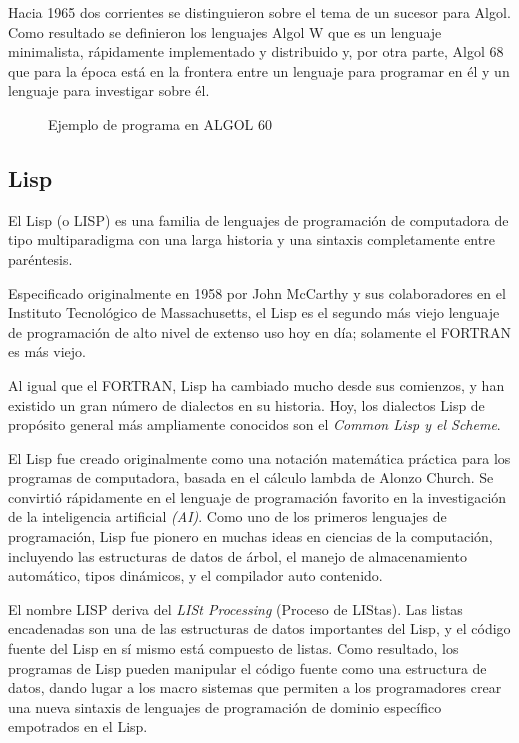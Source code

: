 \documentclass[twoside,twocolumn]{article}
\begin{document}
Hacia 1965 dos corrientes se distinguieron sobre el tema de un sucesor para Algol. Como resultado se definieron los lenguajes Algol W que es un lenguaje minimalista, rápidamente implementado y distribuido y, por otra parte, Algol 68 que para la época está en la frontera entre un lenguaje para programar en él y un lenguaje para investigar sobre él.


\begin{figure}[h]
\label{Fig1}
\caption[al.png]{Ejemplo de programa en ALGOL 60 }
\end{figure}

\subsection{Lisp}

El Lisp (o LISP) es una familia de lenguajes de programación de computadora de tipo multiparadigma con una larga historia y una sintaxis completamente entre paréntesis.

Especificado originalmente en 1958 por John McCarthy y sus colaboradores en el Instituto Tecnológico de Massachusetts, el Lisp es el segundo más viejo lenguaje de programación de alto nivel de extenso uso hoy en día; solamente el FORTRAN es más viejo.

Al igual que el FORTRAN, Lisp ha cambiado mucho desde sus comienzos, y han existido un gran número de dialectos en su historia. Hoy, los dialectos Lisp de propósito general más ampliamente conocidos son el \textit{Common Lisp y el Scheme}.

El Lisp fue creado originalmente como una notación matemática práctica para los programas de computadora, basada en el cálculo lambda de Alonzo Church. Se convirtió rápidamente en el lenguaje de programación favorito en la investigación de la inteligencia artificial \textit{(AI)}. Como uno de los primeros lenguajes de programación, Lisp fue pionero en muchas ideas en ciencias de la computación, incluyendo las estructuras de datos de árbol, el manejo de almacenamiento automático, tipos dinámicos, y el compilador auto contenido.

El nombre LISP deriva del \textit{LISt Processing} (Proceso de LIStas). Las listas encadenadas son una de las estructuras de datos importantes del Lisp, y el código fuente del Lisp en sí mismo está compuesto de listas. Como resultado, los programas de Lisp pueden manipular el código fuente como una estructura de datos, dando lugar a los macro sistemas que permiten a los programadores crear una nueva sintaxis de lenguajes de programación de dominio específico empotrados en el Lisp.
\end{document}
